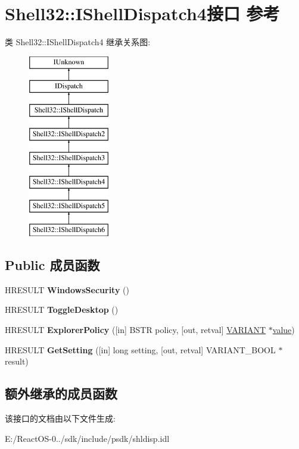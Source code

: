 \hypertarget{interface_shell32_1_1_i_shell_dispatch4}{}\section{Shell32\+:\+:I\+Shell\+Dispatch4接口 参考}
\label{interface_shell32_1_1_i_shell_dispatch4}
类 Shell32\+:\+:I\+Shell\+Dispatch4 继承关系图\+:\begin{figure}[H]
\begin{center}
\leavevmode
\includegraphics[height=8.000000cm]{interface_shell32_1_1_i_shell_dispatch4}
\end{center}
\end{figure}
\subsection*{Public 成员函数}
\begin{DoxyCompactItemize}
\item 
\mbox{\label{interface_shell32_1_1_i_shell_dispatch4_a6abb269544dcf3c069bfda4e37049397}} 
H\+R\+E\+S\+U\+LT {\bfseries Windows\+Security} ()
\item 
\mbox{\label{interface_shell32_1_1_i_shell_dispatch4_a43d36045eb5b2c9d7a84f7a0f3c64c2e}} 
H\+R\+E\+S\+U\+LT {\bfseries Toggle\+Desktop} ()
\item 
\mbox{\label{interface_shell32_1_1_i_shell_dispatch4_a0a88f7ee43567e295ca78c68cd44ade8}} 
H\+R\+E\+S\+U\+LT {\bfseries Explorer\+Policy} (\mbox{[}in\mbox{]} B\+S\+TR policy, \mbox{[}out, retval\mbox{]} \hyperlink{structtag_v_a_r_i_a_n_t}{V\+A\+R\+I\+A\+NT} $\ast$\hyperlink{unionvalue}{value})
\item 
\mbox{\label{interface_shell32_1_1_i_shell_dispatch4_ae7ddd571b746076cb8596f959d150125}} 
H\+R\+E\+S\+U\+LT {\bfseries Get\+Setting} (\mbox{[}in\mbox{]} long setting, \mbox{[}out, retval\mbox{]} V\+A\+R\+I\+A\+N\+T\+\_\+\+B\+O\+OL $\ast$result)
\end{DoxyCompactItemize}
\subsection*{额外继承的成员函数}


该接口的文档由以下文件生成\+:\begin{DoxyCompactItemize}
\item 
E\+:/\+React\+O\+S-\/0../sdk/include/psdk/shldisp.\+idl\end{DoxyCompactItemize}
